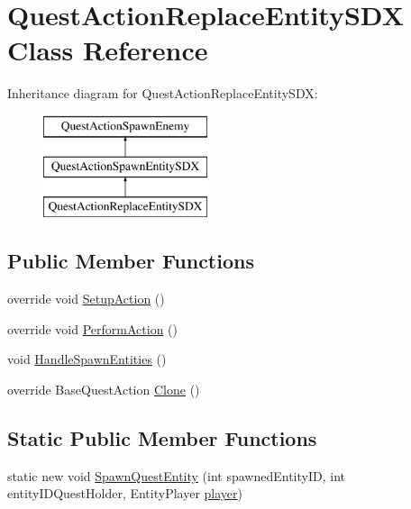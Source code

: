 \hypertarget{class_quest_action_replace_entity_s_d_x}{}\section{Quest\+Action\+Replace\+Entity\+S\+DX Class Reference}
\label{class_quest_action_replace_entity_s_d_x}
Inheritance diagram for Quest\+Action\+Replace\+Entity\+S\+DX\+:\begin{figure}[H]
\begin{center}
\leavevmode
\includegraphics[height=3.000000cm]{de/de6/class_quest_action_replace_entity_s_d_x}
\end{center}
\end{figure}
\subsection*{Public Member Functions}
\begin{DoxyCompactItemize}
\item 
override void \mbox{\hyperlink{class_quest_action_replace_entity_s_d_x_a28155d29875c6d123001c03de564a6a6}{Setup\+Action}} ()
\item 
override void \mbox{\hyperlink{class_quest_action_replace_entity_s_d_x_a01f8dc126bd37662f40449931ce327ba}{Perform\+Action}} ()
\item 
void \mbox{\hyperlink{class_quest_action_replace_entity_s_d_x_ace14a3f3bb754bb3c6f92376820fb936}{Handle\+Spawn\+Entities}} ()
\item 
override Base\+Quest\+Action \mbox{\hyperlink{class_quest_action_replace_entity_s_d_x_a2305810e4e7b526f998f2f4a635bd974}{Clone}} ()
\end{DoxyCompactItemize}
\subsection*{Static Public Member Functions}
\begin{DoxyCompactItemize}
\item 
static new void \mbox{\hyperlink{class_quest_action_replace_entity_s_d_x_a8f4b438b4a683e051201e70381149959}{Spawn\+Quest\+Entity}} (int spawned\+Entity\+ID, int entity\+I\+D\+Quest\+Holder, Entity\+Player \mbox{\hyperlink{_sphere_i_i_01_music_01_boxes_2_config_2_localization_8txt_a4e2cb8aeff651600ea1cc57fe5a929a4}{player}})
\end{DoxyCompactItemize}


